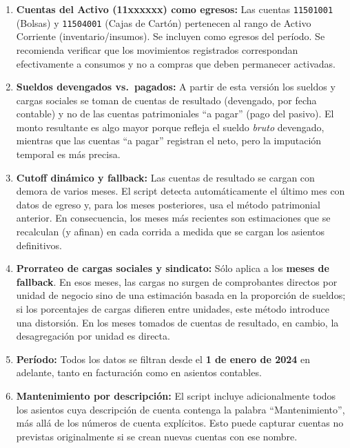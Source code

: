 \documentclass[12pt, a4paper]{article}
\begin{document}
\begin{enumerate}
    \item \textbf{Cuentas del Activo (11xxxxxx) como egresos:} Las cuentas \texttt{11501001} (Bolsas) y \texttt{11504001} (Cajas de Cartón) pertenecen al rango de Activo Corriente (inventario/insumos). Se incluyen como egresos del período. Se recomienda verificar que los movimientos registrados correspondan efectivamente a consumos y no a compras que deben permanecer activadas.

    \item \textbf{Sueldos devengados vs.\ pagados:} A partir de esta versión los sueldos y cargas sociales se toman de cuentas de resultado (devengado, por fecha contable) y no de las cuentas patrimoniales ``a pagar'' (pago del pasivo). El monto resultante es algo mayor porque refleja el sueldo \emph{bruto} devengado, mientras que las cuentas ``a pagar'' registran el neto, pero la imputación temporal es más precisa.

    \item \textbf{Cutoff dinámico y fallback:} Las cuentas de resultado se cargan con demora de varios meses. El script detecta automáticamente el último mes con datos de egreso y, para los meses posteriores, usa el método patrimonial anterior. En consecuencia, los meses más recientes son estimaciones que se recalculan (y afinan) en cada corrida a medida que se cargan los asientos definitivos.

    \item \textbf{Prorrateo de cargas sociales y sindicato:} Sólo aplica a los \textbf{meses de fallback}. En esos meses, las cargas no surgen de comprobantes directos por unidad de negocio sino de una estimación basada en la proporción de sueldos; si los porcentajes de cargas difieren entre unidades, este método introduce una distorsión. En los meses tomados de cuentas de resultado, en cambio, la desagregación por unidad es directa.

    \item \textbf{Período:} Todos los datos se filtran desde el \textbf{1 de enero de 2024} en adelante, tanto en facturación como en asientos contables.

    \item \textbf{Mantenimiento por descripción:} El script incluye adicionalmente todos los asientos cuya descripción de cuenta contenga la palabra ``Mantenimiento'', más allá de los números de cuenta explícitos. Esto puede capturar cuentas no previstas originalmente si se crean nuevas cuentas con ese nombre.


\end{enumerate}
\end{document}
